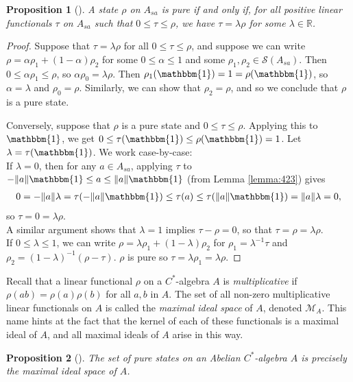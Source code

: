 \documentclass[12pt,a4paper]{report}
\theoremstyle{plain}
\newtheorem{prop}{Proposition}
\theoremstyle{definition}
\newcommand{\1}{\mathbbm{1}}
\newcommand{\R}{\mathbb{R}}
\newcommand{\M}{\mathcal{M}}
\renewcommand{\S}{\mathscr{S}}
\begin{document}
\begin{prop}[{\cite[3.4.6]{kadison83}}]\label{prop:pure2}
	A state $\rho$ on $A_{sa}$ is pure if and only if, for all positive linear functionals $\tau$ on
	 $A_{sa}$ such that $0\leq\tau\leq\rho$, we have $\tau =\lambda\rho$ for some $\lambda\in\R$. 
\end{prop}
\begin{proof}
	Suppose that $\tau =\lambda\rho$ for all $0\leq\tau\leq\rho$, and suppose we can write 
	$\rho=\alpha\rho_1+(1-\alpha)\rho_2$ for some $0\leq\alpha\leq1$ and some $\rho_1,\rho_2 \in
	\S(A_{sa})$. Then $0\leq\alpha\rho_1\leq\rho$, so $\alpha\rho_0 = \lambda\rho$. Then 
	$\rho_1(\1)=1=\rho(\1)$, so $\alpha = \lambda$ and $\rho_0 =\rho$. Similarly, we can show that 
	$\rho_2=\rho$, and so we conclude that $\rho$ is a pure state.
	
	Conversely, suppose that $\rho$ is a pure state and $0\leq\tau\leq\rho$. Applying this to $\1$,
	we get $0\leq\tau(\1)\leq\rho(\1) = 1$. Let $\lambda = \tau(\1)$. We work case-by-case: \\
	If $\lambda=0$, then for any $a\in A_{sa}$, applying $\tau$ to $-\|a\|\1\leq a\leq\|a\|\1$ 
	(from Lemma \ref{lemma:423}) gives
	\begin{align*}
		0=-\|a\|\lambda=\tau(-\|a\|\1)\leq\tau(a)\leq\tau(\|a\|\1)=\|a\|\lambda=0,
	\end{align*}
	so $\tau=0=\lambda\rho$. \\
	A similar argument shows that $\lambda=1$ implies $\tau-\rho=0$, so that $\tau=\rho=\lambda\rho$.\\
	If $0\leq\lambda\leq 1$, we can write $\rho=\lambda\rho_1+(1-\lambda)\rho_2$ for 
	$\rho_1=\lambda^{-1}\tau$ and $\rho_2=(1-\lambda)^{-1}(\rho-\tau)$. $\rho$ is pure so 
	$\tau=\lambda\rho_1=\lambda\rho$.
	
\end{proof}
Recall that a linear functional $\rho$ on a $C^\ast$-algebra $A$ is \emph{multiplicative} if $\rho(ab)=
\rho(a)\rho(b)$ for all $a,b$ in $A$. The set of all non-zero multiplicative linear functionals on $A$ 
is called the \emph{maximal ideal space} of $A$, denoted $\M_A$. This name hints at the fact that the 
kernel of each of these functionals is a maximal ideal of $A$, and all maximal ideals of $A$ arise in 
this way. 
\cite[Theorem I.2.5]{davidson96}
\begin{prop}[{\cite[4.4.1]{kadison83}}]\label{prop:puremult}
	The set of pure states on an Abelian $C^\ast$-algebra $A$ is precisely the maximal ideal space of 
	$A$.
\end{prop}
\end{document}
